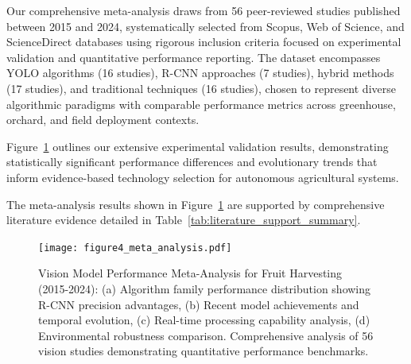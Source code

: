 \documentclass{ieeeaccess}
\begin{document}
Our comprehensive meta-analysis draws from 56 peer-reviewed studies published between 2015 and 2024, systematically selected from Scopus, Web of Science, and ScienceDirect databases using rigorous inclusion criteria focused on experimental validation and quantitative performance reporting. The dataset encompasses YOLO algorithms (16 studies), R-CNN approaches (7 studies), hybrid methods (17 studies), and traditional techniques (16 studies), chosen to represent diverse algorithmic paradigms with comparable performance metrics across greenhouse, orchard, and field deployment contexts.

Figure~\ref{fig:meta_analysis_ieee} outlines our extensive experimental validation results, demonstrating statistically significant performance differences and evolutionary trends that inform evidence-based technology selection for autonomous agricultural systems.

The meta-analysis results shown in Figure~\ref{fig:meta_analysis_ieee} are supported by comprehensive literature evidence detailed in Table~\ref{tab:literature_support_summary}.

\begin{figure}[htbp]
\centering
\texttt{[image: figure4\_meta\_analysis.pdf]}
\caption{Vision Model Performance Meta-Analysis for Fruit Harvesting (2015-2024): (a) Algorithm family performance distribution showing R-CNN precision advantages, (b) Recent model achievements and temporal evolution, (c) Real-time processing capability analysis, (d) Environmental robustness comparison. Comprehensive analysis of 56 vision studies demonstrating quantitative performance benchmarks.}
\label{fig:meta_analysis_ieee}
\end{figure}
\end{document}
